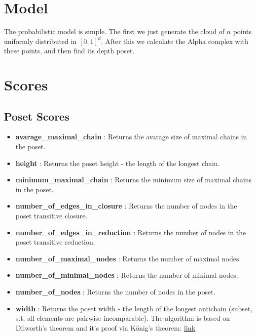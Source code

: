 \documentclass{article}
\begin{document}
\section{Model}
\par The probabilistic model is simple. The first we just generate the cloud of $n$ points uniformly distributed in $[0, 1]^d$. After this we calculate the Alpha complex with these points, and then find its depth poset.

\section{Scores}
\subsection{Poset Scores}
\begin{itemize}
\item \textbf{avarage\_maximal\_chain }: Returns the avarage size of maximal chains in the poset.
\item \textbf{height }: Returns the poset height - the length of the longest chain.
\item \textbf{minimum\_maximal\_chain }: Returns the minimum size of maximal chains in the poset.
\item \textbf{number\_of\_edges\_in\_closure }: Returns the number of nodes in the poset transitive closure.
\item \textbf{number\_of\_edges\_in\_reduction }: Returns the number of nodes in the poset transitive reduction.
\item \textbf{number\_of\_maximal\_nodes }: Returns the number of maximal nodes.
\item \textbf{number\_of\_minimal\_nodes }: Returns the number of minimal nodes.
\item \textbf{number\_of\_nodes }: Returns the number of nodes in the poset.
\item \textbf{width }: Returns the poset width - the length of the longest antichain (subset, s.t. all elements are pairwise incomparable).
    The algorithm is based on Dilworth's theorem and it's proof via Kőnig's theorem:
    \href{https://en.wikipedia.org/wiki/Dilworth%27s_theorem}{link}
\end{itemize}
\end{document}
